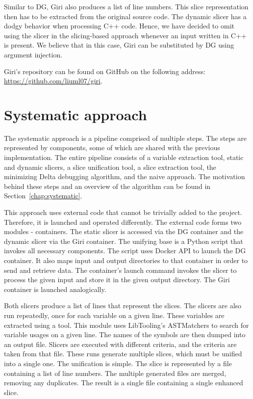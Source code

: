 Similar to DG, Giri also produces a list of line numbers. 
This slice representation then has to be extracted from the original source 
code.
The dynamic slicer has a dodgy behavior when processing C++ code. 
Hence, we have decided to omit using the slicer in the slicing-based approach 
whenever an input written in C++ is present. 
We believe that in this case, Giri can be substituted by DG using argument 
injection.

Giri's repository can be found on GitHub on the following address: 
\url{https://github.com/liuml07/giri}.

\section{Systematic approach}

The systematic approach is a pipeline comprised of multiple steps. 
The steps are represented by components, some of which are shared with 
the previous implementation. 
The entire pipeline consists of a variable extraction tool, static and 
dynamic slicers, a slice unification tool, a slice extraction tool, 
the minimizing Delta debugging algorithm, and the naive approach. 
The motivation behind these steps and an overview of the algorithm can be 
found in Section~\ref{chap:systematic}.

This approach uses external code that cannot be trivially added to 
the project.
Therefore, it is launched and operated differently.
The external code forms two modules - containers. 
The static slicer is accessed via the DG container and the dynamic slicer 
via the Giri container. 
The unifying base is a Python script that invokes all necessary components.
The script uses Docker API to launch the DG container.
It also maps input and output directories to that container in order to send 
and retrieve data.
The container's launch command invokes the slicer to process the given input 
and store it in the given output directory.
The Giri container is launched analogically.

Both slicers produce a list of lines that represent the slices. 
The slicers are also run repeatedly, once for each variable on a given line. 
These variables are extracted using a  tool. 
This module uses LibTooling's ASTMatchers to search for variable usages on 
a given line. 
The names of the symbols are then dumped into an output file. 
Slicers are executed with different criteria, and the criteria are taken 
from that file.
These runs generate multiple slices, which must be unified into a single one. 
The unification is simple. 
The slice is represented by a file containing a list of line numbers. 
The multiple generated files are merged, removing any duplicates. 
The result is a single file containing a single enhanced slice. 

